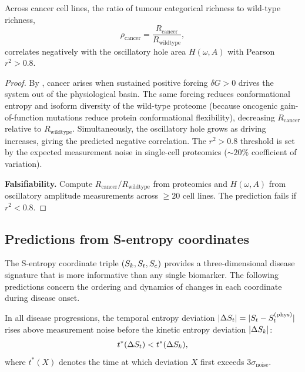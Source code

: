 \begin{theorem}
\label{thm:ch07-P6}
Across cancer cell lines, the ratio of tumour categorical richness to
wild-type richness,
\begin{equation}
  \rho_{\mathrm{cancer}}
  = \frac{R_{\mathrm{cancer}}}{R_{\mathrm{wildtype}}},
  \label{eq:ch07-P6-richness-ratio}
\end{equation}
correlates negatively with the oscillatory hole area $H(\omega, A)$ with
Pearson $r^2 > 0.8$.
\end{theorem}

\begin{proof}
By , cancer arises when sustained positive forcing
$\delta G > 0$ drives the system out of the physiological basin.  The
same forcing reduces conformational entropy and isoform diversity of the
wild-type proteome (because oncogenic gain-of-function mutations reduce
protein conformational flexibility), decreasing $R_{\mathrm{cancer}}$ relative
to $R_{\mathrm{wildtype}}$.  Simultaneously, the oscillatory hole grows as
driving increases, giving the predicted negative correlation.  The $r^2 > 0.8$
threshold is set by the expected measurement noise in single-cell proteomics
($\sim 20\%$ coefficient of variation).

\textbf{Falsifiability.}  Compute $R_{\mathrm{cancer}}/R_{\mathrm{wildtype}}$
from proteomics and $H(\omega, A)$ from oscillatory amplitude measurements
across $\geq 20$ cell lines.  The prediction fails if $r^2 < 0.8$.
\end{proof}

\subsection{Predictions from S-entropy coordinates}
\label{sec:ch07-pred-sentropy}

The S-entropy coordinate triple $(S_k, S_t, S_e)$ provides a three-dimensional
disease signature that is more informative than any single biomarker.  The
following predictions concern the ordering and dynamics of changes in each
coordinate during disease onset.

\begin{theorem}
\label{thm:ch07-P7}
In all disease progressions, the temporal entropy deviation
$|\Delta S_t| = |S_t - S_t^{(\mathrm{phys})}|$ rises above measurement noise
before the kinetic entropy deviation $|\Delta S_k|$:
\begin{equation}
  t^{*}(\Delta S_t) < t^{*}(\Delta S_k),
  \label{eq:ch07-P7-ordering}
\end{equation}
where $t^{*}(X)$ denotes the time at which deviation $X$ first exceeds
$3\sigma_{\mathrm{noise}}$.
\end{theorem}

